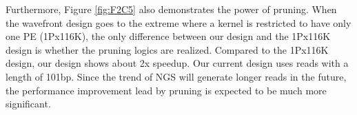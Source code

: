 Furthermore, Figure \ref{fig:F2C5} also demonstrates the power of pruning. 
When the wavefront design goes to the extreme where a kernel is restricted to have only one PE (1Px116K), 
the only difference between our design and the 1Px116K design is whether the pruning logics are realized. 
Compared to the 1Px116K design, our design shows about 2x speedup.
Our current design uses reads with a length of 101bp.
Since the trend of NGS will generate longer reads in the future, the performance improvement lead by pruning is expected to be much more significant.
